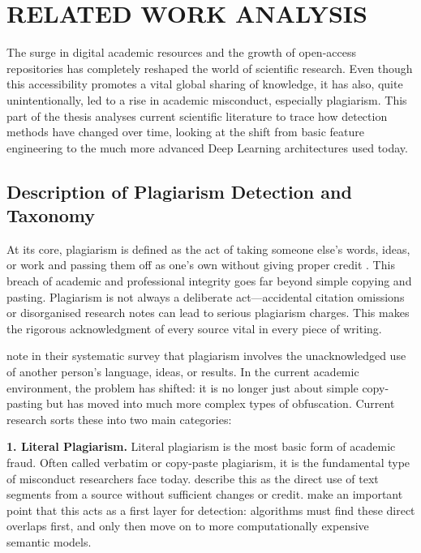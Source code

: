 \documentclass[12pt, a4paper]{article}
\begin{document}
\newpage
\section{RELATED WORK ANALYSIS}

The surge in digital academic resources and the growth of open-access repositories has completely reshaped the world of scientific research. Even though this accessibility promotes a vital global sharing of knowledge, it has also, quite unintentionally, led to a rise in academic misconduct, especially plagiarism. This part of the thesis analyses current scientific literature to trace how detection methods have changed over time, looking at the shift from basic feature engineering to the much more advanced Deep Learning architectures used today.

\subsection{Description of Plagiarism Detection and Taxonomy}

At its core, plagiarism is defined as the act of taking someone else's words, ideas, or work and passing them off as one's own without giving proper credit \citep{Smith2023}. This breach of academic and professional integrity goes far beyond simple copying and pasting. Plagiarism is not always a deliberate act---accidental citation omissions or disorganised research notes can lead to serious plagiarism charges. This makes the rigorous acknowledgment of every source vital in every piece of writing.

\citet{Amirzhanov2025} note in their systematic survey that plagiarism involves the unacknowledged use of another person's language, ideas, or results. In the current academic environment, the problem has shifted: it is no longer just about simple copy-pasting but has moved into much more complex types of obfuscation. Current research sorts these into two main categories:

\textbf{1. Literal Plagiarism.}
Literal plagiarism is the most basic form of academic fraud. Often called verbatim or copy-paste plagiarism, it is the fundamental type of misconduct researchers face today. \citet{Amirzhanov2025} describe this as the direct use of text segments from a source without sufficient changes or credit. \citet{Setu2025} make an important point that this acts as a first layer for detection: algorithms must find these direct overlaps first, and only then move on to more computationally expensive semantic models.
\end{document}
